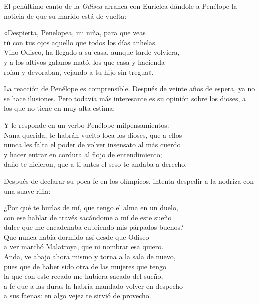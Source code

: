 \label{cap:penelope}

El penúltimo canto de la \emph{Odisea} arranca con Euriclea dándole a Penélope la noticia de que su marido está de vuelta:

\begin{versocita}
«Despierta, Penelopea, mi niña, para que veas\\
tú con tus ojos aquello que todos los días anhelas.\\
Vino Odiseo, ha llegado a su casa, aunque tarde volviera,\\
y a los altivos galanos mató, los que casa y hacienda\\
roían y devoraban, vejando a tu hijo sin tregua».
\end{versocita}

La reacción de Penélope es comprensible. Después de veinte años de espera, ya no se hace ilusiones. Pero todavía más interesante es su opinión sobre los dioses, a los que no tiene en muy alta estima:

\begin{versocita}
Y le responde en un verbo Penélope milpensamientos:\\
Nana querida, te habrán vuelto loca los dioses, que a ellos\\
nunca les falta el poder de volver insensato al más cuerdo\\
y hacer entrar en cordura al flojo de entendimiento;\\
daño te hicieron, que a ti antes el seso te andaba a derecho.
\end{versocita}

Después de declarar su poca fe en los olímpicos, intenta despedir a la nodriza con una suave riña:

\begin{versocita}
¿Por qué te burlas de mí, que tengo el alma en un duelo,\\
con ese hablar de través sacándome a mí de este sueño\\
dulce que me encadenaba cubriendo mis párpados buenos?\\
Que nunca había dormido así desde que Odiseo\\
a ver marchó Malatroya, que ni nombrar esa quiero.\\
Anda, ve abajo ahora mismo y torna a la sala de nuevo,\\
pues que de haber sido otra de las mujeres que tengo\\
la que con este recado me hubiera sacado del sueño,\\
a fe que a las duras la habría mandado volver en despecho\\
a sus faenas: en algo vejez te sirvió de provecho.
\end{versocita}

